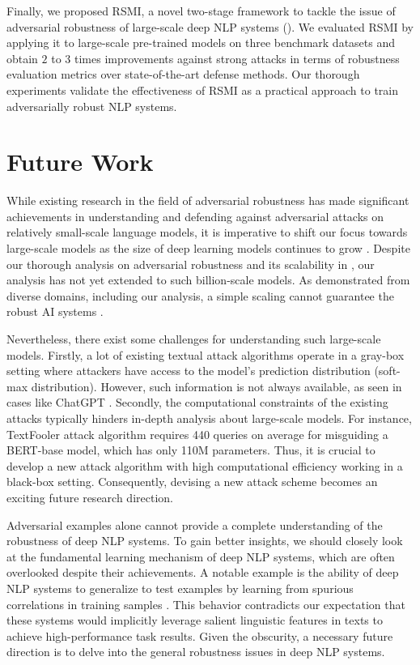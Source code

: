 Finally, we proposed RSMI, a novel two-stage framework to tackle the issue of adversarial robustness of large-scale deep NLP systems (\cf {}). We evaluated RSMI by applying it to large-scale pre-trained models on three benchmark datasets and obtain $2$ to $3$ times improvements against strong attacks in terms of robustness evaluation metrics over state-of-the-art defense methods. Our thorough experiments validate the effectiveness of RSMI as a practical approach to train adversarially robust NLP systems. 

\section{Future Work}

While existing research in the field of adversarial robustness has made significant achievements in understanding and defending against adversarial attacks on relatively small-scale language models, it is imperative to shift our focus towards large-scale models as the size of deep learning models continues to grow \citep{brown2020language,rae2021scaling,chowdhery2022palm,OPT,chatgpt}. Despite our thorough analysis on adversarial robustness and its scalability in , our analysis has not yet extended to such billion-scale models. As demonstrated from diverse domains, including our analysis, a simple scaling cannot guarantee the robust AI systems \citep{Zhang2023TransferableAA,li2022adversarial}. 

Nevertheless, there exist some challenges for understanding such large-scale models. Firstly, a lot of existing textual attack algorithms operate in a gray-box setting where attackers have access to the model's prediction distribution (\ie soft-max distribution). However, such information is not always available, as seen in cases like ChatGPT \citep{chatgpt}. Secondly, the computational constraints of the existing attacks typically hinders in-depth analysis about large-scale models. For instance, TextFooler attack algorithm \citep{jin2019textfooler} requires 440 queries on average for misguiding a BERT-base model, which has only 110M parameters. Thus, it is crucial to develop a new attack algorithm with high computational efficiency working in a black-box setting. Consequently, devising a new attack scheme becomes an exciting future research direction. 

Adversarial examples alone cannot provide a complete understanding of the robustness of deep NLP systems. To gain better insights, we should closely look at the fundamental learning mechanism of deep NLP systems, which are often overlooked despite their achievements. A notable example is the ability of deep NLP systems to generalize to test examples by learning from spurious correlations in training samples \citep{wang-etal-2022-identifying}. This behavior contradicts our expectation that these systems would implicitly leverage salient linguistic features in texts to achieve high-performance task results. Given the obscurity, a necessary future direction is to delve into the general robustness issues in deep NLP systems. 

